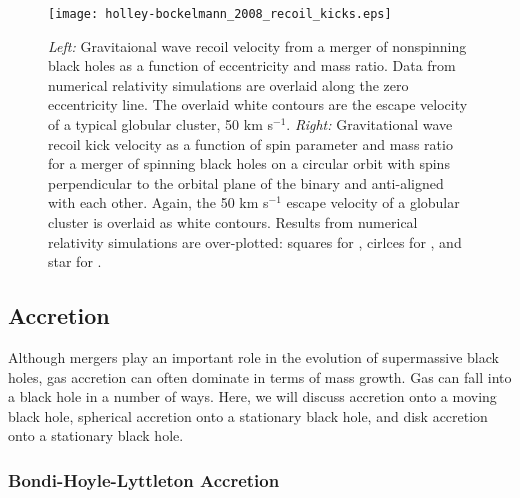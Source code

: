 \begin{figure}[H]
\centering
\texttt{[image: holley-bockelmann\_2008\_recoil\_kicks.eps]}
\caption[Gravitaional wave recoil velocity from black hole mergers]{\footnotesize \textit{Left:} Gravitaional wave recoil velocity from a merger of nonspinning black holes as a function of eccentricity and mass ratio.  Data from numerical relativity simulations \citep{gonzalez_2007} are overlaid along the zero eccentricity line.  The overlaid white contours are the escape velocity of a typical globular cluster, 50 km s$^{-1}$.  \textit{Right:} Gravitational wave recoil kick velocity as a function of spin parameter and mass ratio for a merger of spinning black holes on a circular orbit with spins perpendicular to the orbital plane of the binary and anti-aligned with each other.  Again, the 50 km s$^{-1}$ escape velocity of a globular cluster is overlaid as white contours.  Results from numerical relativity simulations are over-plotted:  squares for \citet{koppitz_2007}, cirlces for \citet{herrmann_2007}, and star for \citet{brugmann_2004}.  \citep{holley-bockelmann_2008}}
\label{fig:recoil_kicks}
\end{figure}



\subsection{Accretion}

Although mergers play an important role in the evolution of supermassive black holes, gas accretion can often dominate in terms of mass growth.  Gas can fall into a black hole in a number of ways.  Here, we will discuss accretion onto a moving black hole, spherical accretion onto a stationary black hole, and disk accretion onto a stationary black hole.


\subsubsection{Bondi-Hoyle-Lyttleton Accretion}

